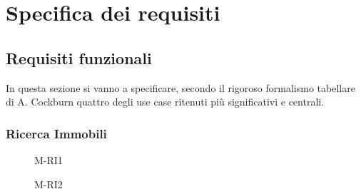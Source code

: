 \chapter{Specifica dei requisiti}
\section{Requisiti funzionali}
In questa sezione si vanno a specificare, secondo il rigoroso 
formalismo tabellare di A. Cockburn quattro degli use case ritenuti 
più significativi e centrali.
\subsection{Ricerca Immobili}

\begin{figure}[H]
    \centering
    \caption{M-RI1}
    \label{fig:M-RI1}
\end{figure}

\begin{figure}[H]
    \centering
    \caption{M-RI2}
    \label{fig:M-RI2}
\end{figure}

